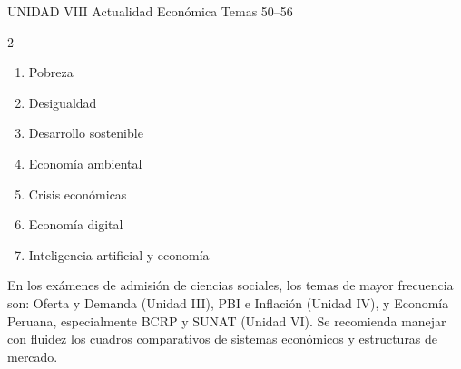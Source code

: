\vspace{0.3cm}

\begin{tcolorbox}[enhanced, colback=AzulMedio, colframe=DoradoAcadémico,
    arc=3pt, boxrule=1pt, left=8pt, right=8pt, top=5pt, bottom=5pt,
    fontupper=\sffamily\bfseries\color{white}]
  UNIDAD VIII \hfill Actualidad Económica \hfill Temas 50–56
\end{tcolorbox}
\begin{multicols}{2}
  \begin{enumerate}[label=\textcolor{AzulMedio}{\textbf{\arabic*.}},
      leftmargin=2em, itemsep=1pt, start=50]
    \item Pobreza
    \item Desigualdad
    \item Desarrollo sostenible
    \item Economía ambiental
    \item Crisis económicas
    \item Economía digital
    \item Inteligencia artificial y economía
  \end{enumerate}
\end{multicols}

\vspace{0.5cm}

\begin{cajatip}
  En los exámenes de admisión de ciencias sociales, los temas de mayor frecuencia
  son: Oferta y Demanda (Unidad III), PBI e Inflación (Unidad IV), y Economía
  Peruana, especialmente BCRP y SUNAT (Unidad VI). Se recomienda manejar con
  fluidez los cuadros comparativos de sistemas económicos y estructuras de mercado.
\end{cajatip}

\newpage